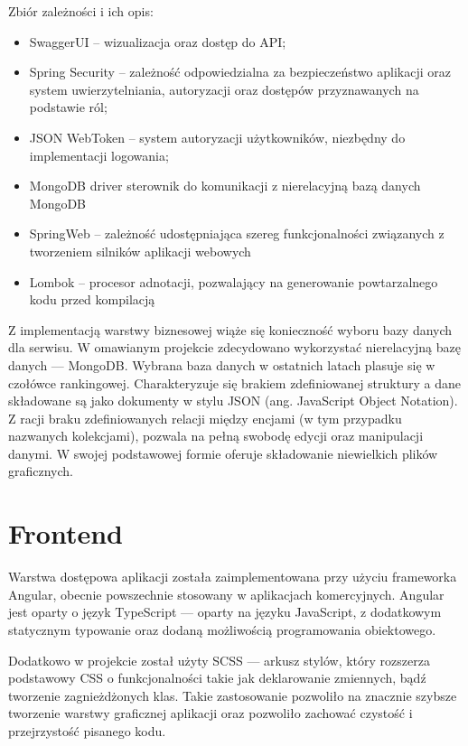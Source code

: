 Zbiór zależności i ich opis:
\begin{itemize}
    \item SwaggerUI -- wizualizacja oraz dostęp do API;
    \item Spring Security -- zależność odpowiedzialna za bezpieczeństwo aplikacji oraz system uwierzytelniania, autoryzacji oraz dostępów przyznawanych na podstawie ról;
    \item JSON WebToken -- system autoryzacji użytkowników, niezbędny do implementacji logowania;
    \item MongoDB driver sterownik do komunikacji z nierelacyjną bazą danych MongoDB
    \item SpringWeb -- zależność udostępniająca szereg funkcjonalności związanych z tworzeniem silników aplikacji webowych
    \item Lombok -- procesor adnotacji, pozwalający na generowanie powtarzalnego kodu przed kompilacją
\end{itemize}

Z implementacją warstwy biznesowej wiąże się konieczność wyboru bazy danych dla serwisu. W omawianym projekcie zdecydowano wykorzystać nierelacyjną bazę danych — MongoDB. Wybrana baza danych w ostatnich latach plasuje się w czołówce rankingowej. Charakteryzuje się brakiem zdefiniowanej struktury a dane składowane są jako dokumenty w stylu JSON (ang. JavaScript Object Notation). Z racji braku zdefiniowanych relacji między encjami (w tym przypadku nazwanych kolekcjami), pozwala na pełną swobodę edycji oraz manipulacji danymi. W swojej podstawowej formie oferuje składowanie niewielkich plików graficznych.

\section{Frontend}
Warstwa dostępowa aplikacji została zaimplementowana przy użyciu frameworka Angular, obecnie powszechnie stosowany w aplikacjach komercyjnych. Angular jest oparty o język TypeScript — oparty na języku JavaScript, z dodatkowym statycznym typowanie oraz dodaną możliwością programowania obiektowego.

Dodatkowo w projekcie został użyty SCSS — arkusz stylów, który rozszerza podstawowy CSS o funkcjonalności takie jak deklarowanie zmiennych, bądź tworzenie zagnieżdżonych klas. Takie zastosowanie pozwoliło na znacznie szybsze tworzenie warstwy graficznej aplikacji oraz pozwoliło zachować czystość i przejrzystość pisanego kodu.